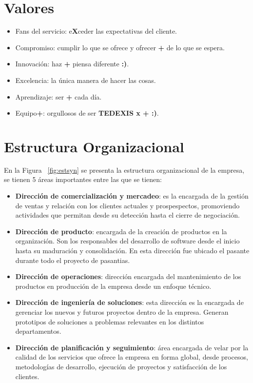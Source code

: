 \section{Valores}
\begin{itemize}[noitemsep,nolistsep]
\item Fans del servicio: e\textbf{X}ceder las expectativas del cliente.
\item Compromiso: cumplir lo que se ofrece y ofrecer \textbf{+} de lo que se espera.
\item Innovación: haz \textbf{+} piensa diferente \textbf{:)}.
\item Excelencia: la única manera de hacer las cosas.
\item Aprendizaje: ser \textbf{+} cada día.
\item Equipo\textbf{+}: orgullosos de ser \textbf{TEDEXIS x + :)}.
\end{itemize}

\section{Estructura Organizacional} \label{sect:Estructura Organizacional}
	En la Figura ~\ref{fig:estsyn} se presenta la estructura organizacional de la empresa, se tienen 5 áreas importantes entre las que se tienen:


\begin{itemize}[noitemsep,nolistsep]
\item \textbf{Dirección de comercialización y mercadeo}: es la encargada de la gestión de ventas y relación con los clientes actuales y prospespectos, promoviendo actividades que permitan desde su detección hasta el cierre de negociación.
\item \textbf{Dirección de producto}: encargada de la creación de productos en la organización. Son los responsables del desarrollo de software desde el inicio hasta su maduración y consolidación. En esta dirección fue ubicado el pasante durante todo el proyecto de pasantias.
\item \textbf{Dirección de operaciones}: dirección encargada del mantenimiento de los productos en producción de la empresa desde un enfoque técnico.
\item \textbf{Dirección de ingeniería de soluciones}: esta dirección es la encargada de gerenciar los nuevos y futuros proyectos dentro de la empresa. Generan prototipos de soluciones a problemas relevantes en los distintos departamentos.
\item \textbf{Dirección de planificación y seguimiento}: área encargada de velar por la calidad de los servicios que ofrece la empresa en forma global, desde procesos, metodologías de desarrollo, ejecución de proyectos y satisfacción de los clientes.
\end{itemize}

